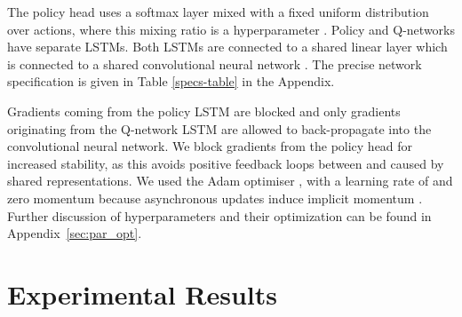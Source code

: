 \documentclass{article}
\begin{document}
The policy head uses a softmax layer mixed with a fixed 
uniform distribution over actions, where this mixing ratio is a 
hyperparameter \citep[Section 5.1.3]{wiering1999explorations}. Policy and 
Q-networks have separate LSTMs. 
Both LSTMs are connected to a shared 
linear layer which is connected to a shared convolutional neural network 
\citep{krizhevsky2012imagenet}. The precise network
specification is given in Table 
\ref{specs-table} in the Appendix.

Gradients coming from the policy LSTM are blocked and only gradients 
originating from the Q-network LSTM are allowed to back-propagate into the convolutional 
neural network. We block gradients 
from the policy head for increased stability, as this avoids positive feedback 
loops between  and  caused by shared representations. We used the Adam optimiser \citep{kingma2014adam}, with a learning rate of  
and zero momentum because asynchronous updates induce 
implicit momentum \citep{mitliagkas2016asynchrony}. 
Further discussion of hyperparameters and their optimization can be found in Appendix~\ref{sec:par_opt}.



\section{Experimental Results}\label{sec:results}
\iffalse
\begin{figure}
\centering
\vspace{0pt}
\begin{minipage}{.32\textwidth}
  \centerline{\texttt{[image: aggregate\_mean]}}
\end{minipage}\vspace{0pt}
\begin{minipage}{.32\textwidth}
\vspace{0pt}
  \centering
  \texttt{[image: aggregate\_median]}
\end{minipage}
\begin{minipage}{.32\textwidth}
\vspace{0pt}
  \centering
  \texttt{[image: scaling\_median]}
\end{minipage}
  \caption{
  \small 'Reactor' includes distributional Retrace 
     algorithm, prioritized replay and beta-LOO policy 
     gradient with . The other curves show algorithms 
     performance by removing each of the components and changing the number of 
     workers.}
  \label{learningcurves}
\end{figure}
\fi
\end{document}
